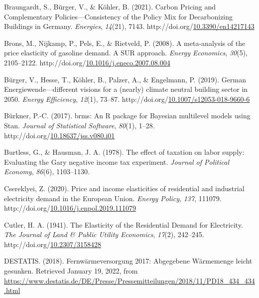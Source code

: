 \documentclass[12pt,twoside]{reedthesis}
\newlength{\cslhangindent}
\newenvironment{CSLReferences}[2] %
 {%
  \setlength{\parindent}{0pt}
  \ifodd #1 \everypar{\setlength{\hangindent}{\cslhangindent}}\ignorespaces\fi
  \ifnum #2 > 0
  \setlength{\parskip}{#2\baselineskip}
  \fi
 }%
 {}
\begin{document}
\begin{CSLReferences}{1}{0}
\leavevmode{}%
Braungardt, S., Bürger, V., \& Köhler, B. (2021). Carbon Pricing and Complementary Policies---Consistency of the Policy Mix for Decarbonizing Buildings in Germany. \emph{Energies}, \emph{14}(21), 7143. http://doi.org/\href{https://doi.org/10.3390/en14217143}{10.3390/en14217143}

\leavevmode{}%
Brons, M., Nijkamp, P., Pels, E., \& Rietveld, P. (2008). A meta-analysis of the price elasticity of gasoline demand. A SUR approach. \emph{Energy Economics}, \emph{30}(5), 2105--2122. http://doi.org/\href{https://doi.org/10.1016/j.eneco.2007.08.004}{10.1016/j.eneco.2007.08.004}

\leavevmode{}%
Bürger, V., Hesse, T., Köhler, B., Palzer, A., \& Engelmann, P. (2019). German Energiewende---different visions for a (nearly) climate neutral building sector in 2050. \emph{Energy Efficiency}, \emph{12}(1), 73--87. http://doi.org/\href{https://doi.org/10.1007/s12053-018-9660-6}{10.1007/s12053-018-9660-6}

\leavevmode{}%
Bürkner, P.-C. (2017). brms: An R package for Bayesian multilevel models using Stan. \emph{Journal of Statistical Software}, \emph{80}(1), 1--28. http://doi.org/\href{https://doi.org/10.18637/jss.v080.i01}{10.18637/jss.v080.i01}

\leavevmode{}%
Burtless, G., \& Hausman, J. A. (1978). The effect of taxation on labor supply: Evaluating the Gary negative income tax experiment. \emph{Journal of Political Economy}, \emph{86}(6), 1103--1130.

\leavevmode{}%
Csereklyei, Z. (2020). Price and income elasticities of residential and industrial electricity demand in the European Union. \emph{Energy Policy}, \emph{137}, 111079. http://doi.org/\href{https://doi.org/10.1016/j.enpol.2019.111079}{10.1016/j.enpol.2019.111079}

\leavevmode{}%
Cutler, H. A. (1941). The Elasticity of the Residential Demand for Electricity. \emph{The Journal of Land \& Public Utility Economics}, \emph{17}(2), 242--245. http://doi.org/\href{https://doi.org/10.2307/3158428}{10.2307/3158428}

\leavevmode{}%
DESTATIS. (2018). Fernwärmeversorgung 2017: Abgegebene Wärmemenge leicht gesunken. Retrieved January 19, 2022, from \url{https://www.destatis.de/DE/Presse/Pressemitteilungen/2018/11/PD18_434_434.html}


\end{CSLReferences}
\end{document}
